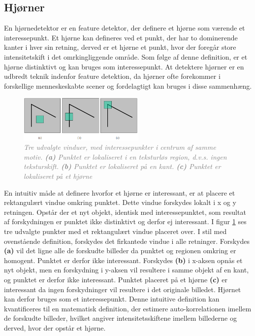 \subsection{Hjørner}\label{subsec:corner}
En hjørnedetektor er en feature detektor, der definere et hjørne som værende et interessepunkt. Et hjørne kan defineres ved et punkt, der har to dominerende kanter i hver sin retning, derved er et hjørne et punkt, hvor der foregår store intensitetskift i det omrkingliggende område. Som følge af denne definition, er et hjørne distinktivt og kan bruges som interessepunkt. At detektere hjørner er en udbredt teknik indenfor feature detektion, da hjørner ofte forekommer i forskellige menneskeskabte scener og fordelagtigt kan bruges i disse sammenhæng.
\begin{figure}[H]
    \centering
    \includegraphics[width=0.55\textwidth]{fig/6.png}
    \vspace{-1em}   
    \begin{center}    
    \caption{\textcolor{gray}{\footnotesize \textit{
     Tre udvalgte vinduer, med interessepunkter i centrum af samme motiv. \textbf{(a)} Punktet er lokaliseret i en teksturløs region, d.v.s. ingen teksturskift. \textbf{(b)} Punktet er lokaliseret på en kant. \textbf{(c)} Punktet er lokaliseret på et hjørne }}}
    \label{fig:2}
     \end{center}
    \vspace{-2.7em}  
  \end{figure}  
\noindent
En intuitiv måde at definere hvorfor et hjørne er interessant, er at placere et rektangulært vindue omkring punktet. Dette vindue forskydes lokalt i x og y retningen. Opstår der et nyt objekt, identisk med interessepunktet, som resultat af forskydningen er punktet ikke distinktivt og derfor ej interessant. I figur \ref{fig:2} ses tre udvalgte punkter med et rektangulært vindue placeret over. I stil med ovenstående definition, forskydes det firkantede vindue i alle retninger. Forskydes \textbf{(a)} vil det ligne alle de forskudte billeder da punktet og regionen omkring er homogent. Punktet er derfor ikke interessant. Forskydes \textbf{(b)} i x-aksen opnås et nyt objekt, men en forskydning i y-aksen vil resultere i samme objekt af en kant, og punktet er derfor ikke interessant. Punktet placeret på et hjørne \textbf{(c)} er interessant da ingen forskydninger vil resultere i det originale billedet. Hjørnet kan derfor bruges som et interessepunkt. Denne intuitive definition kan kvantificeres til en matematisk definition, der estimere auto-korrelationen imellem de forskudte billeder, hvilket angiver intensitetsskiftene imellem billederne og derved, hvor der opstår et hjørne. 